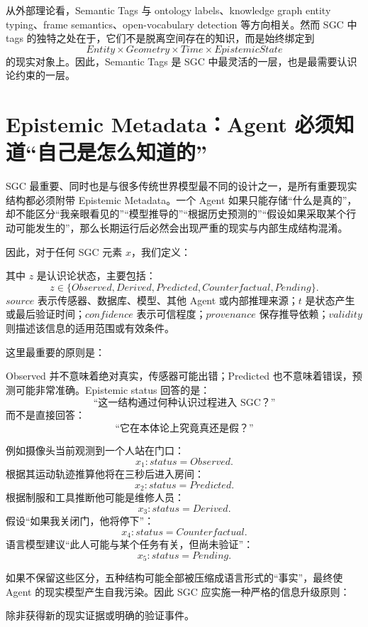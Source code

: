 从外部理论看，Semantic Tags 与 ontology labels、knowledge graph entity typing、frame semantics、open-vocabulary detection 等方向相关。然而 SGC 中 tags 的独特之处在于，它们不是脱离空间存在的知识，而是始终绑定到
\[
Entity\times Geometry\times Time\times EpistemicState
\]
的现实对象上。因此，Semantic Tags 是 SGC 中最灵活的一层，也是最需要认识论约束的一层。

\section{Epistemic Metadata：Agent 必须知道“自己是怎么知道的”}

SGC 最重要、同时也是与很多传统世界模型最不同的设计之一，是所有重要现实结构都必须附带 Epistemic Metadata。一个 Agent 如果只能存储“什么是真的”，却不能区分“我亲眼看见的”“模型推导的”“根据历史预测的”“假设如果采取某个行动可能发生的”，那么长期运行后必然会出现严重的现实与内部生成结构混淆。

因此，对于任何 SGC 元素 $x$，我们定义：
\begin{statementbox}
\centering
{}
\end{statementbox}
其中 $z$ 是认识论状态，主要包括：
\[
z\in
\{
Observed,
Derived,
Predicted,
Counterfactual,
Pending
\}.
\]
$source$ 表示传感器、数据库、模型、其他 Agent 或内部推理来源；$t$ 是状态产生或最后验证时间；$confidence$ 表示可信程度；$provenance$ 保存推导依赖；$validity$ 则描述该信息的适用范围或有效条件。

这里最重要的原则是：
\begin{statementbox}
\centering
{}
\end{statementbox}
Observed 并不意味着绝对真实，传感器可能出错；Predicted 也不意味着错误，预测可能非常准确。Epistemic status 回答的是：
\[
\text{“这一结构通过何种认识过程进入 SGC？”}
\]
而不是直接回答：
\[
\text{“它在本体论上究竟真还是假？”}
\]

例如摄像头当前观测到一个人站在门口：
\[
x_1:
status=Observed.
\]
根据其运动轨迹推算他将在三秒后进入房间：
\[
x_2:
status=Predicted.
\]
根据制服和工具推断他可能是维修人员：
\[
x_3:
status=Derived.
\]
假设“如果我关闭门，他将停下”：
\[
x_4:
status=Counterfactual.
\]
语言模型建议“此人可能与某个任务有关，但尚未验证”：
\[
x_5:
status=Pending.
\]

如果不保留这些区分，五种结构可能全部被压缩成语言形式的“事实”，最终使 Agent 的现实模型产生自我污染。因此 SGC 应实施一种严格的信息升级原则：
\begin{statementbox}
\centering
{}
\end{statementbox}
除非获得新的现实证据或明确的验证事件。

